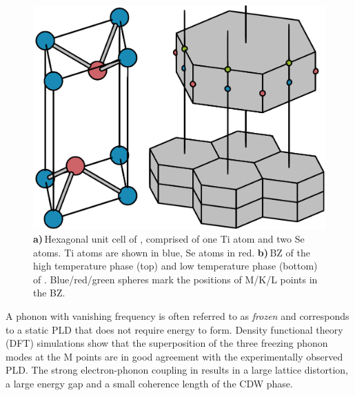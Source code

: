 \begin{figure}[!t]
	\begin{minipage}{0.5\columnwidth}
		\includegraphics[width=\columnwidth]{figs/tise2_crystal.png}
	\end{minipage}
	\hspace{0.04\columnwidth}
	\begin{minipage}{0.45\columnwidth}
		\caption{\textbf{a)}\,Hexagonal unit cell of \ts, comprised of one Ti atom and two Se atoms. Ti atoms are shown in blue, Se atoms in red. \textbf{b)}\,\ac{BZ} of the high temperature phase (top) and low temperature phase (bottom) of \ts. Blue/red/green spheres mark the positions of M/K/L points in the \ac{BZ}.}
		\label{fig:crystal}
	\end{minipage}
\end{figure}

A phonon with vanishing frequency is often referred to as \emph{frozen} and corresponds to a static \ac{PLD} that does not require energy to form.
Density functional theory (DFT) simulations show that the superposition of the three freezing phonon modes at the M points are in good agreement with the experimentally observed \ac{PLD}\cite{kaneko2018}. %
The strong electron-phonon coupling in \ts\space results in a large lattice distortion, a large energy gap and a small coherence length of the \ac{CDW} phase\cite{haas1978,hildebrand2016}.

